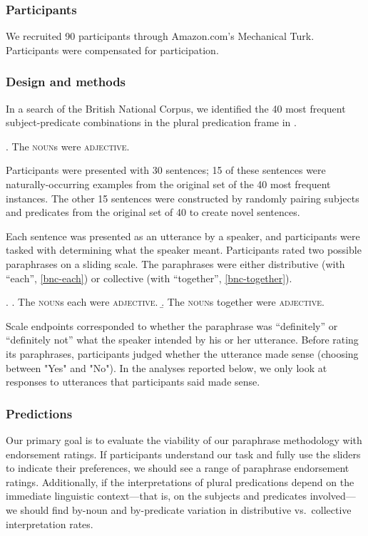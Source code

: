 \documentclass[linguex]{sp}
\begin{document}
\subsubsection{Participants}

We recruited 90 participants through Amazon.com's Mechanical Turk. Participants were compensated for participation.

\subsubsection{Design and methods}

In a search of the British National Corpus, we identified the 40 most frequent subject-predicate combinations in the plural predication frame in \Next.

\ex. The \textsc{noun}s were \textsc{adjective}.

Participants were presented with 30 sentences; 15 of these sentences were naturally-occurring examples from the original set of the 40 most frequent instances. The other 15 sentences were constructed by randomly pairing subjects and predicates from the original set of 40 to create novel sentences.

Each sentence was presented as an utterance by a speaker, and participants were tasked with determining what the speaker meant. Participants rated two possible paraphrases on a sliding scale. The paraphrases were either distributive (with ``each'', \ref{bnc-each}) or collective (with ``together'', \ref{bnc-together}). 

\ex. \a. The \textsc{noun}s each were \textsc{adjective}. \label{bnc-each}
\b. The \textsc{noun}s together were \textsc{adjective}. \label{bnc-together}

Scale endpoints corresponded to whether the paraphrase was ``definitely'' or ``definitely not'' what the speaker intended by his or her utterance. Before rating its paraphrases, participants judged whether the utterance made sense (choosing between "Yes" and "No"). In the analyses reported below, we only look at responses to utterances that participants said made sense.

\subsubsection{Predictions}

Our primary goal is to evaluate the viability of our paraphrase methodology with endorsement ratings. If participants understand our task and fully use the sliders to indicate their preferences, we should see a range of paraphrase endorsement ratings. Additionally, if the interpretations of plural predications depend on the immediate linguistic context---that is, on the subjects and predicates involved---we should find by-noun and by-predicate variation in distributive vs.~collective interpretation rates.
\end{document}
